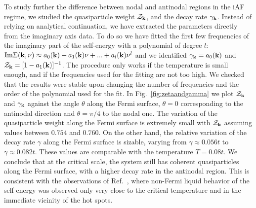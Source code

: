 To study further the difference between nodal and antinodal regions in the iAF regime, we studied the quasiparticle weight \cite{Abrikosov1963} $\mathcal{Z}_{\mathbf{k}}$, and the decay rate $\gamma_{\mathbf{k}}$.
Instead of relying on analytical continuation, we have extracted the parameters directly from the imaginary axis data.
To do so we have fitted the first few frequencies of the imaginary part of the self-energy with a polynomial of degree $l$: $\mathrm{Im}\Sigma(\mathbf{k},\nu) \approx a_0(\mathbf{k})+a_1(\mathbf{k})\nu+...+a_l(\mathbf{k})\nu^l$ and we identified $\gamma_{\mathbf{k}}=a_0(\mathbf{k})$ and $\mathcal{Z}_{\mathbf{k}}= [1-a_1(\mathbf{k})]^{-1}$.
The procedure only works if the temperature is small enough, and if the frequencies used for the fitting are not too high. We checked that the results were stable upon changing the number of frequencies and the order of the polynomial used for the fit. 
In Fig.~\ref{fig:zetaandgamma} we plot $\mathcal{Z}_{\mathbf{k}}$ and $\gamma_{\mathbf{k}}$ against the angle $\theta$ along the Fermi surface, $\theta=0$ corresponding to the antinodal direction and $\theta=\pi/4$ to the nodal one. 
The variation of the quasiparticle weight along the Fermi surface is extremely small with $\mathcal{Z}_{\mathbf{k}}$ assuming values between $0.754$ and $0.760$. 
On the other hand, the relative variation of the decay rate $\gamma$ along the Fermi surface is sizable, varying from $\gamma\approx 0.056t$ to $\gamma \approx 0.082t$. These values are comparable with the temperature $T=0.08t$. 
We conclude that at the critical scale, the system still has coherent quasiparticles along the Fermi surface, with a higher decay rate in the antinodal region. This is consistent with the observations of Ref.~, where non-Fermi liquid behavior of the self-energy was observed only very close to the critical temperature and in the immediate vicinity of the hot spots.%




